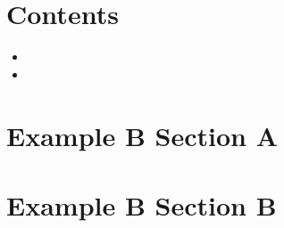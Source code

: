 
\section*{Contents}
\begin{itemize}
	\item {}
	\item {}
\end{itemize}



\section{Example B Section A}
\label{sec:s-example-b.a}


\lipsum[4-6]


\section{Example B Section B}
\label{sec:s-example-b.b}

\lipsum[1-2]
